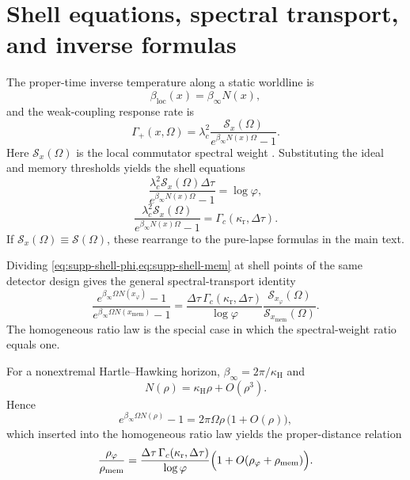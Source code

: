 \documentclass[11pt]{amsart}
\numberwithin{equation}{section}
\theoremstyle{remark}
\begin{document}
\section{Shell equations, spectral transport, and inverse formulas}\label{sec:supp-kms}

The proper-time inverse temperature along a static worldline is
\[
\beta_{\mathrm{loc}}(x)=\beta_\infty N(x),
\]
and the weak-coupling response rate is
\begin{equation}\label{eq:supp-kms-rate}
\Gamma_+(x,\Omega)=\lambda_c^2\frac{\mathcal S_x(\Omega)}{e^{\beta_\infty N(x)\Omega}-1}.
\end{equation}
Here $\mathcal S_x(\Omega)$ is the local commutator spectral weight \cite{KayWald1991,BuchholzSchlemmer2007,Solveen2012,GranseePinamontiVerch2017}.
Substituting the ideal and memory thresholds yields the shell equations
\begin{equation}\label{eq:supp-shell-phi}
\frac{\lambda_c^2\mathcal S_x(\Omega)\Delta\tau}{e^{\beta_\infty N(x)\Omega}-1}=\log\varphi,
\end{equation}
\begin{equation}\label{eq:supp-shell-mem}
\frac{\lambda_c^2\mathcal S_x(\Omega)}{e^{\beta_\infty N(x)\Omega}-1}=\Gamma_c(\kappa_{\mathrm r},\Delta\tau).
\end{equation}
If $\mathcal S_x(\Omega)\equiv\mathcal S(\Omega)$, these rearrange to the pure-lapse formulas in the main text.

Dividing \cref{eq:supp-shell-phi,eq:supp-shell-mem} at shell points of the same detector design gives the general spectral-transport identity
\begin{equation}\label{eq:supp-spectral-transport}
\frac{e^{\beta_\infty\Omega N(x_{\varphi})}-1}
     {e^{\beta_\infty\Omega N(x_{\mathrm{mem}})}-1}
=
\frac{\Delta\tau\,\Gamma_c(\kappa_{\mathrm r},\Delta\tau)}{\log\varphi}
\frac{\mathcal S_{x_{\varphi}}(\Omega)}{\mathcal S_{x_{\mathrm{mem}}}(\Omega)}.
\end{equation}
The homogeneous ratio law is the special case in which the spectral-weight ratio equals one.

For a nonextremal Hartle--Hawking horizon, $\beta_\infty=2\pi/\kappa_{\mathrm H}$ and
\[
N(\rho)=\kappa_{\mathrm H}\rho+O(\rho^3).
\]
Hence
\[
e^{\beta_\infty\Omega N(\rho)}-1
=
2\pi\Omega\rho\,\bigl(1+O(\rho)\bigr),
\]
which inserted into the homogeneous ratio law yields the proper-distance relation
\begin{equation}\label{eq:supp-rho-ratio}
\frac{\rho_{\varphi}}{\rho_{\mathrm{mem}}}
=
\frac{\Delta\tau\,\Gamma_c(\kappa_{\mathrm r},\Delta\tau)}{\log\varphi}
\Bigl(1+O(\rho_{\varphi}+\rho_{\mathrm{mem}})\Bigr).
\end{equation}
\end{document}
